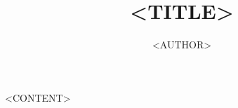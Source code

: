 \documentclass[11pt]{scrartcl}
\title{<TITLE>}
\author{<AUTHOR>}
\begin{document}
\maketitle

<CONTENT>
\end{document}
